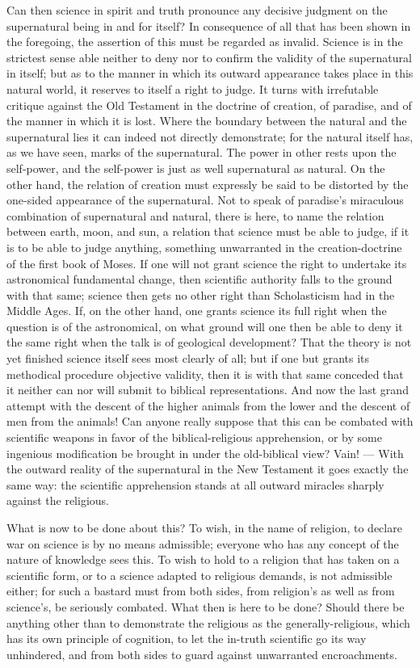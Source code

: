 \documentclass[12pt]{book}
\begin{document}
Can then science in spirit and truth pronounce any decisive judgment on the supernatural being in
and for itself? In consequence of all that has been shown in the foregoing, the assertion of this
must be regarded as invalid. Science is in the strictest sense able neither to deny nor to confirm
the validity of the supernatural in itself; but as to the manner in which its outward appearance
takes place in this natural world, it reserves to itself a right to judge. It turns with
irrefutable critique against the Old Testament in the doctrine of creation, of paradise, and of the
manner in which it is lost. Where the boundary between the natural and the supernatural lies it can
indeed not directly demonstrate; for the natural itself has, as we have seen, marks of the
supernatural. The power in other rests upon the self-power, and the self-power is just as well
supernatural as natural. On the other hand, the relation of creation must expressly be said to be
distorted by the one-sided appearance of the supernatural. Not to speak of paradise's miraculous
combination of supernatural and natural, there is here, to name the relation between earth, moon,
and sun, a relation that science must be able to judge, if it is to be able to judge anything,
something unwarranted in the creation-doctrine of the first book of Moses. If one will not grant
science the right to undertake its astronomical fundamental change, then scientific authority falls
to the ground with that same; science then gets no other right than Scholasticism had in the Middle
Ages. If, on the other hand, one grants science its full right when the question is of the
astronomical, on what ground will one then be able to deny it the same right when the talk is of
geological development? That the theory is not yet finished science itself sees most clearly of all;
but if one but grants its methodical procedure objective validity, then it is with that same
conceded that it neither can nor will submit to biblical representations. And now the last grand
attempt with the descent of the higher animals from the lower and the descent of men from the
animals! Can anyone really suppose that this can be combated with scientific weapons in favor of
the biblical-religious apprehension, or by some ingenious modification be brought in under the
old-biblical view? Vain! --- With the outward reality of the supernatural in the New Testament it
goes exactly the same way: the scientific apprehension stands at all outward miracles sharply
against the religious.

What is now to be done about this? To wish, in the name of religion, to declare war on science is
by no means admissible; everyone who has any concept of the nature of knowledge sees this. To wish
to hold to a religion that has taken on a scientific form, or to a science adapted to religious
demands, is not admissible either; for such a bastard must from both sides, from religion's as well
as from science's, be seriously combated. What then is here to be done? Should there be anything
other than to demonstrate the religious as the generally-religious, which has its own principle of
cognition, to let the in-truth scientific go its way unhindered, and from both sides to guard
against unwarranted encroachments.
\end{document}
